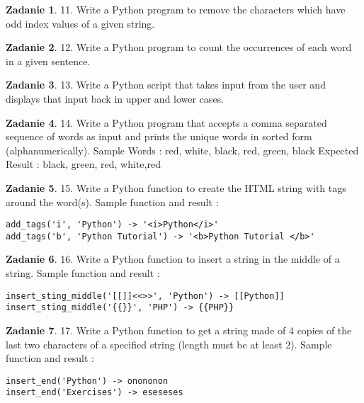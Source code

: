 \documentclass[11pt]{article}
\theoremstyle{definition}
\newtheorem{zadanie}{Zadanie}
\begin{document}
\begin{zadanie}


11. Write a Python program to remove the characters which have odd index values of a given string. 

\end{zadanie}

\begin{zadanie}


12. Write a Python program to count the occurrences of each word in a given sentence. 

\end{zadanie}

\begin{zadanie}


13. Write a Python script that takes input from the user and displays that input back in upper and lower cases. 

\end{zadanie}

\begin{zadanie}


14. Write a Python program that accepts a comma separated sequence of words as input and prints the unique words in sorted form (alphanumerically). 
Sample Words : red, white, black, red, green, black
Expected Result : black, green, red, white,red

\end{zadanie}

\begin{zadanie}


15. Write a Python function to create the HTML string with tags around the word(s). 
Sample function and result :
\begin{verbatim}
add_tags('i', 'Python') -> '<i>Python</i>'
add_tags('b', 'Python Tutorial') -> '<b>Python Tutorial </b>'
\end{verbatim}
\end{zadanie}

\begin{zadanie}


16. Write a Python function to insert a string in the middle of a string. 
Sample function and result :
\begin{verbatim}
insert_sting_middle('[[]]<<>>', 'Python') -> [[Python]]
insert_sting_middle('{{}}', 'PHP') -> {{PHP}}
\end{verbatim}
\end{zadanie}

\begin{zadanie}


17. Write a Python function to get a string made of 4 copies of the last two characters of a specified string (length must be at least 2). 
Sample function and result :
\begin{verbatim}
insert_end('Python') -> onononon
insert_end('Exercises') -> eseseses
\end{verbatim}
\end{zadanie}
\end{document}
